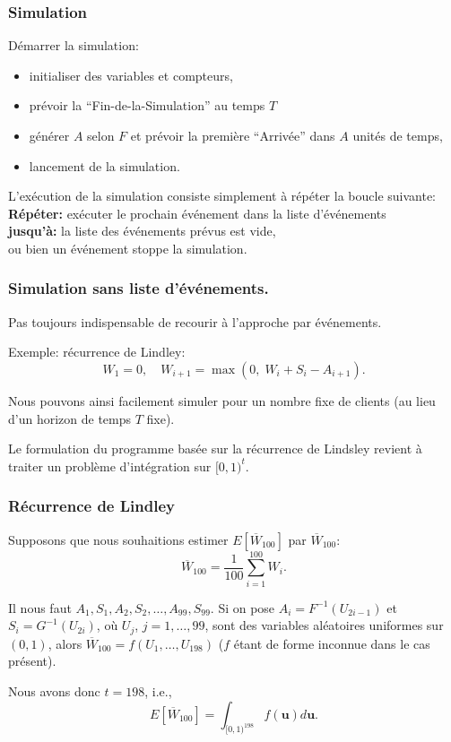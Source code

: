 \documentclass[t,usepdftitle=false]{beamer}
\def\bu{\boldsymbol{u}}
\begin{document}
\begin{frame}
\frametitle{Simulation}

Démarrer la simulation:
\begin{itemize}
\item
initialiser des variables et compteurs,
\item
prévoir la ``Fin-de-la-Simulation'' au temps $T$
\item
générer $A$ selon $F$ et prévoir la première ``Arrivée'' dans $A$ unités de temps,
\item
lancement de la simulation.
\end{itemize}

\mbox{}

L'exécution de la simulation consiste simplement à répéter la boucle
suivante:\\
{\bf Répéter:} exécuter le prochain événement
     dans la liste d'événements\\
{\bf jusqu'à:} la liste des événements prévus est vide,\\
\quad    ou bien un événement stoppe la simulation.

\end{frame}

\begin{frame}
\frametitle{Simulation sans liste d'événements.}

Pas toujours indispensable de recourir à l'approche par événements.

\mbox{}

Exemple: récurrence de Lindley:
\[
 W_1 = 0,\quad W_{i+1} = \max(0,\; W_i + S_i - A_{i+1}).
\]

Nous pouvons ainsi facilement simuler pour un nombre fixe de clients (au lieu d'un horizon de temps $T$ fixe).

\mbox{}

Le formulation du programme basée sur la récurrence de Lindsley revient à traiter un problème d'intégration sur $[0,1)^t$.

\end{frame}

\begin{frame}
\frametitle{Récurrence de Lindley}

Supposons que nous souhaitions estimer $E[\overline{W}_{100}]$ par
${\overline{W}_{100}}$:
\[
{\overline{W}_{100}} = \frac{1}{100} \sum_{i=1}^100 W_i.
\]

\mbox{}

Il nous faut $A_1, S_1, A_2, S_2, \dots, A_{99}, S_{99}$.
Si on pose ${A_i} = F^{-1}(U_{2i-1})$ et ${S_i} = G^{-1}(U_{2i})$, où
$U_j$, $j = 1,\ldots,99$, sont des variables aléatoires uniformes sur
$(0,1)$, alors $\overline{W}_{100} = f(U_1,\dots,U_{198})$ ($f$ étant de
forme inconnue dans le cas présent).

\mbox{}

Nous avons donc $t=198$, i.e., 
\[
  E[\overline{W}_{100}] = \int_{[0,1)^{198}} f(\bu)d\bu.
\]

\end{frame}
\end{document}

